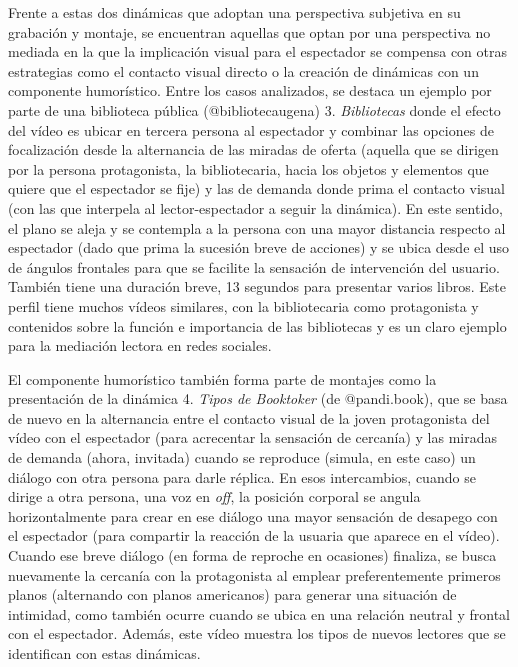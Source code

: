 Frente a estas dos dinámicas que adoptan una perspectiva subjetiva en su
grabación y montaje, se encuentran aquellas que optan por una
perspectiva no mediada en la que la implicación visual para el
espectador se compensa con otras estrategias como el contacto visual
directo o la creación de dinámicas con un componente humorístico. Entre
los casos analizados, se destaca un ejemplo por parte de una biblioteca
pública (@bibliotecaugena) 3. \emph{Bibliotecas} donde el efecto del
vídeo es ubicar en tercera persona al espectador y combinar las opciones
de focalización desde la alternancia de las miradas de oferta (aquella
que se dirigen por la persona protagonista, la bibliotecaria, hacia los
objetos y elementos que quiere que el espectador se fije) y las de
demanda donde prima el contacto visual (con las que interpela al
lector-espectador a seguir la dinámica). En este sentido, el plano se
aleja y se contempla a la persona con una mayor distancia respecto al
espectador (dado que prima la sucesión breve de acciones) y se ubica
desde el uso de ángulos frontales para que se facilite la sensación de
intervención del usuario. También tiene una duración breve, 13 segundos
para presentar varios libros. Este perfil tiene muchos vídeos similares,
con la bibliotecaria como protagonista y contenidos sobre la función e
importancia de las bibliotecas y es un claro ejemplo para la mediación
lectora en redes sociales.

El componente humorístico también forma parte de montajes como la
presentación de la dinámica 4. \emph{Tipos de Booktoker} (de
@pandi.book), que se basa de nuevo en la alternancia entre el contacto
visual de la joven protagonista del vídeo con el espectador (para
acrecentar la sensación de cercanía) y las miradas de demanda (ahora,
invitada) cuando se reproduce (simula, en este caso) un diálogo con otra
persona para darle réplica. En esos intercambios, cuando se dirige a
otra persona, una voz en \emph{off}, la posición corporal se angula
horizontalmente para crear en ese diálogo una mayor sensación de
desapego con el espectador (para compartir la reacción de la usuaria que
aparece en el vídeo). Cuando ese breve diálogo (en forma de reproche en
ocasiones) finaliza, se busca nuevamente la cercanía con la protagonista
al emplear preferentemente primeros planos (alternando con planos
americanos) para generar una situación de intimidad, como también ocurre
cuando se ubica en una relación neutral y frontal con el espectador.
Además, este vídeo muestra los tipos de nuevos lectores que se
identifican con estas dinámicas.

